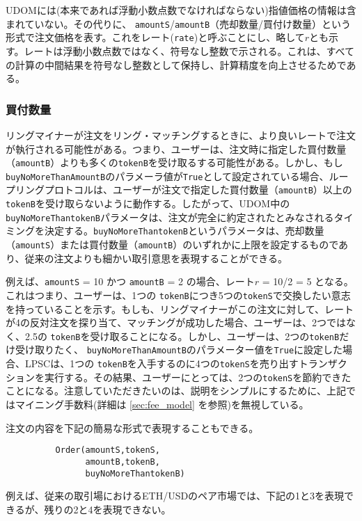 \documentclass{article}
\begin{document}
\begin{multicols}{2}
UDOMには(本来であれば浮動小数点数でなければならない)指値価格の情報は含まれていない。その代りに、 \verb|amountS|/\verb|amountB|（売却数量/買付け数量）という形式で注文価格を表す。これをレート(\verb|rate|)と呼ぶことにし、略して$r$とも示す。レートは浮動小数点数ではなく、符号なし整数で示される。これは、すべての計算の中間結果を符号なし整数として保持し、計算精度を向上させるためである。


\subsubsection{買付数量}
リングマイナーが注文をリング・マッチングするときに、より良いレートで注文が執行される可能性がある。つまり、ユーザーは、注文時に指定した買付数量（\verb|amountB|）よりも多くの\verb|tokenB|を受け取るする可能性がある。しかし、もし\verb|buyNoMoreThanAmountB|のパラメーラ値が\verb|True|として設定されている場合、ループリングプロトコルは、ユーザーが注文で指定した買付数量（\verb|amountB|）以上の\verb|tokenB|を受け取らないように動作する。したがって、UDOM中の \verb|buyNoMoreThantokenB|パラメータは、注文が完全に約定されたとみなされるタイミングを決定する。\verb|buyNoMoreThantokenB|というパラメータは、売却数量（\verb|amountS|）または買付数量（\verb|amountB|）のいずれかに上限を設定するものであり、従来の注文よりも細かい取引意思を表現することができる。


例えば、\verb|amountS| = 10 かつ \verb|amountB| = 2 の場合、レート$r$ = 10/2 = 5 となる。これはつまり、ユーザーは、1つの \verb|tokenB|につき5つの\verb|tokenS|で交換したい意志を持っていることを示す。もしも、リングマイナーがこの注文に対して、レートが4の反対注文を探り当て、マッチングが成功した場合、ユーザーは、2つではなく、2.5の \verb|tokenB|を受け取ることになる。しかし、ユーザーは、2つの\verb|tokenB|だけ受け取りたく、 \verb|buyNoMoreThanAmountB|のパラメーター値を\verb|True|に設定した場合、LPSCは、1つの \verb|tokenB|を入手するのに4つの\verb|tokenS|を売り出すトランザクションを実行する。その結果、ユーザーにとっては、2つの\verb|tokenS|を節約できたことになる。注意していただきたいのは、説明をシンプルにするために、上記ではマイニング手数料(詳細は \ref{sec:fee_model} を参照)を無視している。

注文の内容を下記の簡易な形式で表現することもできる。

\begin{verbatim}
	      Order(amountS,tokenS,
	            amountB,tokenB,
	            buyNoMoreThantokenB)
\end{verbatim}

例えば、従来の取引場におけるETH/USDのペア市場では、下記の1と3を表現できるが、残りの2と4を表現できない。


\end{multicols}
\end{document}
